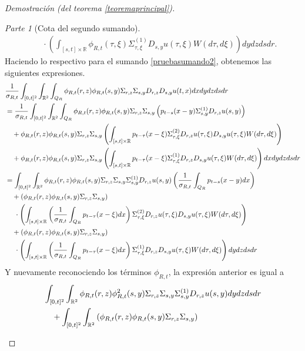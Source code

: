 \documentclass[letterpaper,twoside,12pt]{book}
\newcommand{\R}{\mathbb{R}}
\newcommand{\1}{\mathds{1}}
\theoremstyle{definition}
\theoremstyle{definition}
\theoremstyle{remark}
\newtheorem{proofpart}{Parte}
\theoremstyle{definition}
\theoremstyle{definition}
\theoremstyle{definition}
\theoremstyle{definition}
\theoremstyle{definition}
\begin{document}
\begin{proof}[Demostración (del teorema \ref{teoremaprincipal})]
\begin{proofpart}[Cota del segundo sumando]
\begin{align}
      &\ \ \ \ \cdot\left(\int_{[s,t]\times\R} \phi_{R,t}(\tau,\xi)\Sigma^{(1)}_{\tau,\xi}D_{s,y}u(\tau,\xi)W(d\tau,d\xi)\right)dy dz ds dr\label{pruebasumando4}.
   \end{align}
Haciendo lo respectivo para el sumando \eqref{pruebasumando2}, obtenemos las siguientes expresiones.
\begin{align}
   &\frac{1}{\sigma_{R,t}}\int_{[0,t]^2}\int_{\R^2}\int_{Q_R}\phi_{R,t}(r,z)\phi_{R,t}(s,y)\Sigma_{r,z}\Sigma_{s,y}D_{r,z}D_{s,y}u(t,x)dx dy dz ds dr\notag\\
   &=\frac{1}{\sigma_{R,t}}\int_{[0,t]^2}\int_{\R^2}\int_{Q_R}\phi_{R,t}(r,z)\phi_{R,t}(s,y)\Sigma_{r,z}\Sigma_{s,y}\left( p_{t-s}(x-y)\Sigma^{(1)}_{s,y}D_{r,z}u(s,y)\right)\notag\\
   &\ \ \ +\phi_{R,t}(r,z)\phi_{R,t}(s,y)\Sigma_{r,z}\Sigma_{s,y}\left(\int_{[s,t]\times \R} p_{t-\tau}(x-\xi)\Sigma^{(2)}_{\tau,\xi}D_{r,z}u(\tau,\xi)D_{s,y}u(\tau,\xi)W(d\tau,d\xi)\right)\notag\\
   &\ \ \ +\phi_{R,t}(r,z)\phi_{R,t}(s,y)\Sigma_{r,z}\Sigma_{s,y} \left(\int_{[s,t]\times \R}p_{t-\tau}(x-\xi)\Sigma^{(1)}_{\tau,\xi}D_{r,z}D_{s,y}u(\tau,\xi)W(d\tau,d\xi)\right) dx dy dz ds dr\notag\\
   &=\int_{[0,t]^2}\int_{\R^2}\phi_{R,t}(r,z)\phi_{R,t}(s,y)\Sigma_{r,z}\Sigma_{s,y}\Sigma^{(1)}_{s,y}D_{r,z}u(s,y)\left(\frac{1}{\sigma_{R,t}}\int_{Q_R} p_{t-s}(x-y)dx\right)\notag\\
   &\ \ \ +\left(\phi_{R,t}(r,z)\phi_{R,t}(s,y)\Sigma_{r,z}\Sigma_{s,y}\right)\notag\\
   & \ \ \ \ \cdot\left(\int_{[s,t]\times \R} \left(\frac{1}{\sigma_{R,t}}\int_{Q_R} p_{t-\tau}(x-\xi)dx\right)\Sigma^{(2)}_{\tau,\xi}D_{r,z}u(\tau,\xi)D_{s,y}u(\tau,\xi)W(d\tau,d\xi)\right)\notag\\
   &\ \ \ +\left(\phi_{R,t}(r,z)\phi_{R,t}(s,y)\Sigma_{r,z}\Sigma_{s,y}\right)\notag\\
   &\ \ \ \ \cdot \left(\int_{[s,t]\times \R}\left(\frac{1}{\sigma_{R,t}}\int_{Q_R} p_{t-\tau}(x-\xi)dx\right)\Sigma^{(1)}_{\tau,\xi}D_{r,z}D_{s,y}u(\tau,\xi)W(d\tau,d\xi)\right) dy dz ds dr\notag
\end{align}
Y nuevamente reconociendo los términos $\phi_{R,t}$, la expresión anterior es igual a
\begin{align}
   &\int_{[0,t]^2}\int_{\R^2}\phi_{R,t}(r,z)\phi_{R,t}^2(s,y)\Sigma_{r,z}\Sigma_{s,y}\Sigma^{(1)}_{s,y}D_{r,z}u(s,y)dy dz ds dr\label{pruebasumando5}\\
   &\ \ \ +\int_{[0,t]^2}\int_{\R^2}\left(\phi_{R,t}(r,z)\phi_{R,t}(s,y)\Sigma_{r,z}\Sigma_{s,y}\right)\notag\\

\end{align}
\end{proofpart}
\end{proof}
\end{document}
